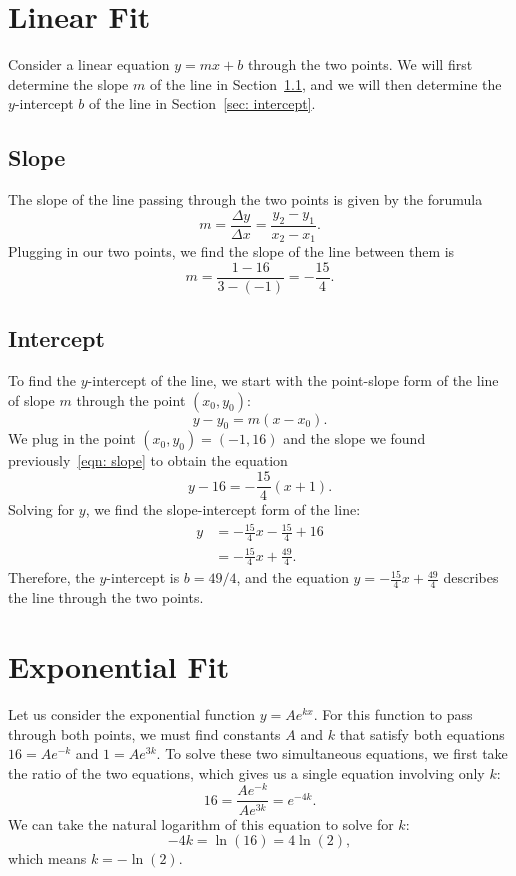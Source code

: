 \documentclass[10pt]{article}         %
\begin{document}
\section{Linear Fit}
\label{sec: linear fit}
Consider a linear equation $y = m x + b$ through the two points.  We will
first determine the slope $m$ of the line in Section~\ref{sec: slope}, and we
will then determine the $y$-intercept $b$ of the line in Section~\ref{sec:
intercept}.

\subsection{Slope}
\label{sec: slope}

The slope of the line passing through the two points is given by the forumula
$$
	m 
	= \frac{\Delta y}{\Delta x} 
	= \frac{y_2 - y_1}{x_2 - x_1}
	.
$$
Plugging in our two points, we find the slope of the line between them is
\begin{equation}
\label{eqn: slope}
	m 
	= \frac{1 - 16}{3 - (-1)}
	= - \frac{15}{4}
	.
\end{equation}

\subsection{Intercept}
\label{sec: intercept}

To find the $y$-intercept of the line, we start with the point-slope form of
the line of slope $m$ through the point $(x_0, y_0)$:
$$
	y - y_0 = m (x - x_0)
	.
$$
We plug in the point $(x_0, y_0) = (-1, 16)$ and the slope we found
previously~\eqref{eqn: slope} to obtain the equation
$$
	y - 16 = - \frac{15}{4} (x + 1)
	.
$$
Solving for $y$, we find the slope-intercept form of the line:
\begin{align*}
	y 
	&= - \frac{15}{4} x - \frac{15}{4} + 16 \\
	&= - \frac{15}{4} x + \frac{49}{4}
	.
\end{align*}
Therefore, the $y$-intercept is $b = 49/4$, and the equation 
$y = - \frac{15}{4} x + \frac{49}{4}$ describes the line through the two
points.

\section{Exponential Fit}
\label{sec: exponential fit}

Let us consider the exponential function $y = A e^{k x}$.  For this function
to pass through both points, we must find constants $A$ and $k$ that satisfy
both equations $16 = A e^{-k}$ and $1 = A e^{3 k}$.  To solve these two
simultaneous equations, we first take the ratio of the two equations, which
gives us a single equation involving only $k$:
$$
	16
	= \frac{A e^{-k}}{A e^{3 k}}
	= e^{-4 k}
	.
$$
We can take the natural logarithm of this equation to solve for $k$:
$$
	-4k = \ln(16) = 4 \ln (2)
	,
$$
which means $k = - \ln(2)$.
\end{document}
